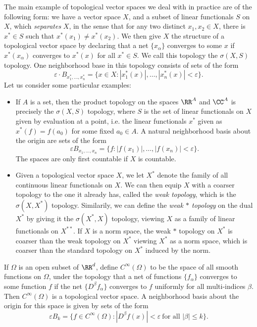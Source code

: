 \begin{example}
    The main example of topological vector spaces we deal with in practice are of the following form: we have a vector space $X$, and a subset of linear functionals $S$ on $X$, which \emph{separates} $X$, in the sense that for any two distinct $x_1,x_2 \in X$, there is $x^* \in S$ such that $x^*(x_1) \neq x^*(x_2)$. We then give $X$ the structure of a topological vector space by declaring that a net $\{ x_\alpha \}$ converges to some $x$ if $x^*(x_\alpha)$ converges to $x^*(x)$ for all $x^* \in S$. We call this topology the $\sigma(X,S)$ topology. One neighborhood base in this topology consists of sets of the form
    \[ \varepsilon \cdot B_{x_1^*, \dots, x_n^*} = \{ x \in X: |x_1^*(x)|, \dots, |x_n^*(x)| < \varepsilon \}. \]
    Let us consider some particular examples:
    \begin{itemize}
        \item If $A$ is a set, then the product topology on the spaces $\RR^A$ and $\CC^A$ is precisely the $\sigma(X,S)$ topology, where $S$ is the set of linear functionals on $X$ given by evaluation at a point, i.e. the linear functionals $x^*$ given as $x^*(f) = f(a_0)$ for some fixed $a_0 \in A$. A natural neighborhood basis about the origin are sets of the form
        \[ \varepsilon B_{x_1,\dots,x_n} = \{ f : |f(x_1)|, \dots, |f(x_n)| < \varepsilon \}. \]
        The spaces are only first countable if $X$ is countable.

        \item Given a topological vector space $X$, we let $X^*$ denote the family of all continuous linear functionals on $X$. We can then equip $X$ with a coarser topology to the one it already has, called the \emph{weak topology}, which is the $\sigma(X,X^*)$ topology. Similarily, we can define the \emph{weak $*$ topology} on the dual $X^*$ by giving it the $\sigma(X^*,X)$ topology, viewing $X$ as a family of linear functionals on $X^{**}$. If $X$ is a norm space, the weak $*$ topology on $X^*$ is coarser than the weak topology on $X^*$ viewing $X^*$ as a norm space, which is coarser than the standard topology on $X^*$ induced by the norm.
    \end{itemize}
\end{example}

\begin{example}
    If $\Omega$ is an open subset of $\RR^d$, define $C^\infty(\Omega)$ to be the space of all smooth functions on $\Omega$, under the topology that a net of functions $\{ f_\alpha \}$ converges to some function $f$ if the net $\{ D^\beta f_\alpha \}$ converges to $f$ uniformly for all multi-indices $\beta$. Then $C^\infty(\Omega)$ is a topological vector space. A neighborhood basis about the origin for this space is given by sets of the form
    \[ \varepsilon B_k = \{ f \in C^\infty(\Omega): |D^\beta f(x)| < \varepsilon\ \text{for all $|\beta| \leq k$} \}. \]
\end{example}

